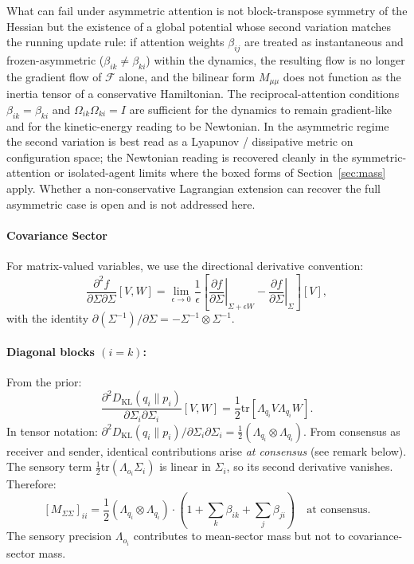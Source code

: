 \documentclass[11pt]{article}
\begin{document}
What can fail under asymmetric attention is not block-transpose symmetry of the Hessian but the existence of a global potential whose second variation matches the running update rule: if attention weights $\beta_{ij}$ are treated as instantaneous and frozen-asymmetric ($\beta_{ik}\neq\beta_{ki}$) within the dynamics, the resulting flow is no longer the gradient flow of $\mathcal{F}$ alone, and the bilinear form $M_{\mu\mu}$ does not function as the inertia tensor of a conservative Hamiltonian. The reciprocal-attention conditions $\beta_{ik} = \beta_{ki}$ and $\Omega_{ik}\Omega_{ki} = I$ are sufficient for the dynamics to remain gradient-like and for the kinetic-energy reading to be Newtonian. In the asymmetric regime the second variation is best read as a Lyapunov / dissipative metric on configuration space; the Newtonian reading is recovered cleanly in the symmetric-attention or isolated-agent limits where the boxed forms of Section~\ref{sec:mass} apply. Whether a non-conservative Lagrangian extension can recover the full asymmetric case is open and is not addressed here.

\paragraph{Covariance Sector}

For matrix-valued variables, we use the directional derivative convention:
\begin{equation}
\frac{\partial^2 f}{\partial \Sigma \partial \Sigma}[V, W] = \lim_{\epsilon \to 0} \frac{1}{\epsilon}\left[\left.\frac{\partial f}{\partial \Sigma}\right|_{\Sigma + \epsilon W} - \left.\frac{\partial f}{\partial \Sigma}\right|_{\Sigma}\right][V],
\end{equation}
with the identity $\partial(\Sigma^{-1})/\partial \Sigma = -\Sigma^{-1} \otimes \Sigma^{-1}$.

\paragraph{Diagonal blocks $(i = k)$:} From the prior:
\begin{equation}
\frac{\partial^2 D_{\mathrm{KL}}(q_i \| p_i)}{\partial \Sigma_i \partial \Sigma_i}[V, W] = \frac{1}{2}\mathrm{tr}[\Lambda_{q_i} V \Lambda_{q_i} W].
\end{equation}
In tensor notation: $\partial^2 D_{\mathrm{KL}}(q_i \| p_i)/\partial \Sigma_i \partial \Sigma_i = \frac{1}{2}(\Lambda_{q_i} \otimes \Lambda_{q_i})$. From consensus as receiver and sender, identical contributions arise \emph{at consensus} (see remark below). The sensory term $\frac{1}{2}\mathrm{tr}(\Lambda_{o_i}\Sigma_i)$ is linear in $\Sigma_i$, so its second derivative vanishes. Therefore:
\begin{equation}
\boxed{[M_{\Sigma\Sigma}]_{ii} = \frac{1}{2}(\Lambda_{q_i} \otimes \Lambda_{q_i}) \cdot \left(1 + \sum_k \beta_{ik} + \sum_j \beta_{ji}\right) \quad \text{at consensus.}}
\label{eq:mass_sigma_diagonal}
\end{equation}
The sensory precision $\Lambda_{o_i}$ contributes to mean-sector mass but not to covariance-sector mass.
\end{document}
